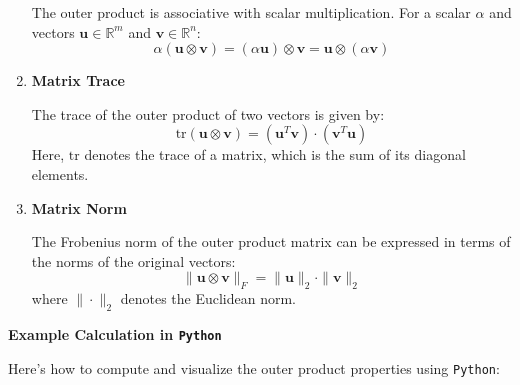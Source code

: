 \documentclass[
  letterpaper,
  DIV=11,
  numbers=noendperiod]{scrreprt}
\theoremstyle{plain}
\theoremstyle{definition}
\theoremstyle{remark}
\begin{document}
\begin{tcolorbox}
\begin{enumerate}
  The outer product is associative with scalar multiplication. For a
  scalar \(\alpha\) and vectors \(\mathbf{u} \in \mathbb{R}^m\) and
  \(\mathbf{v} \in \mathbb{R}^n\):
  \[\alpha (\mathbf{u} \otimes \mathbf{v}) = (\alpha \mathbf{u}) \otimes \mathbf{v} = \mathbf{u} \otimes (\alpha \mathbf{v})\]
\item
  \textbf{Matrix Trace}

  The trace of the outer product of two vectors is given by:
  \[\text{tr}(\mathbf{u} \otimes \mathbf{v}) = (\mathbf{u}^T \mathbf{v}) \cdot (\mathbf{v}^T \mathbf{u})\]
  Here, \(\text{tr}\) denotes the trace of a matrix, which is the sum of
  its diagonal elements.
\item
  \textbf{Matrix Norm}

  The Frobenius norm of the outer product matrix can be expressed in
  terms of the norms of the original vectors:
  \[\| \mathbf{u} \otimes \mathbf{v} \|_F = \| \mathbf{u} \|_2 \cdot \| \mathbf{v} \|_2\]
  where \(\| \cdot \|_2\) denotes the Euclidean norm.
\end{enumerate}

\end{tcolorbox}

\textbf{Example Calculation in \texttt{Python}}

Here's how to compute and visualize the outer product properties using
\texttt{Python}:
\end{document}
